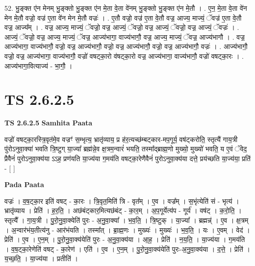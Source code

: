 \documentclass[17pt]{extarticle}
\begin{document}
52. भु॒ङ्क्त ए॑न मेनम् भु॒ङ्क्तो भु॒ङ्क्त ए॑न मे॒ता वे॒ता वे॑नम् भु॒ङ्क्तो भु॒ङ्क्त ए॑न मे॒तौ । . ए॒न॒ मे॒ता वे॒ता वे॑न मेन मे॒तौ वज्रो॒ वज्र॑ ए॒ता वे॑न मेन मे॒तौ वज्रः॑ । . ए॒तौ वज्रो॒ वज्र॑ ए॒ता वे॒तौ वज्र॒ आज्य॒ माज्यं॒ ॅवज्र॑ ए॒ता वे॒तौ वज्र॒ आज्य᳚म् । . वज्र॒ आज्य॒ माज्यं॒ ॅवज्रो॒ वज्र॒ आज्यं॒ ॅवज्रो॒ वज्र॒ आज्यं॒ ॅवज्रो॒ वज्र॒ आज्यं॒ ॅवज्रः॑ । . आज्यं॒ ॅवज्रो॒ वज्र॒ आज्य॒ माज्यं॒ ॅवज्र॒ आज्य॑भागा॒ वाज्य॑भागौ॒ वज्र॒ आज्य॒ माज्यं॒ ॅवज्र॒ आज्य॑भागौ । . वज्र॒ आज्य॑भागा॒ वाज्य॑भागौ॒ वज्रो॒ वज्र॒ आज्य॑भागौ॒ वज्रो॒ वज्र॒ आज्य॑भागौ॒ वज्रो॒ वज्र॒ आज्य॑भागौ॒ वज्रः॑ । . आज्य॑भागौ॒ वज्रो॒ वज्र॒ आज्य॑भागा॒ वाज्य॑भागौ॒ वज्रो॑ वषट्का॒रो व॑षट्का॒रो वज्र॒ आज्य॑भागा॒ वाज्य॑भागौ॒ वज्रो॑ वषट्का॒रः । . आज्य॑भागा॒वित्याज्य॑ - भा॒गौ॒ । \newline
\pagebreak
{}

\section{ TS 2.6.2.5 }

\textbf{TS 2.6.2.5 } \newline
\textbf{Samhita Paata} \newline

वज्रो॑ वषट्का॒रस्त्रि॒वृत॑मे॒व वज्रꣳ॑ स॒म्भृत्य॒ भ्रातृ॑व्याय॒ प्र ह॑र॒त्यच्छ॑म्बट्कार-मप॒गूर्य॒ वष॑ट्करोति॒ स्तृत्यै॑ गाय॒त्री पु॑रोऽनुवा॒क्या॑ भवति त्रि॒ष्टुग् या॒ज्या᳚ ब्रह्म॑न्ने॒व क्ष॒त्रम॒न्वारं॑ भयति॒ तस्मा᳚द्ब्राह्म॒णो मुख्यो॒ मुख्यो॑ भवति॒ य ए॒वं ॅवेद॒ प्रैवैनं॑ पुरोऽनुवा॒क्य॑या ऽऽह॒ प्रण॑यति या॒ज्य॑या ग॒मय॑ति वषट्का॒रेणैवैनं॑ पुरोऽनुवा॒क्य॑या दत्ते॒ प्रय॑च्छति या॒ज्य॑या॒ प्रति॑ - [  ] \newline

\textbf{Pada Paata} \newline

वज्रः॑ । व॒ष॒ट्का॒र इति॑ वषट् - का॒रः । त्रि॒वृत॒मिति॑ त्रि - वृत᳚म् । ए॒व । वज्र᳚म् । स॒भृंत्येति॑ सं - भृत्य॑ । भ्रातृ॑व्याय । प्रेति॑ । ह॒र॒ति॒ । अछ॑बंट्कार॒मित्यछ॑बंट् - का॒र॒म् । अ॒प॒गूर्येत्य॑प - गूर्य॑ । वष॑ट् । क॒रो॒ति॒ । स्तृत्यै᳚ । गा॒य॒त्री । पु॒रो॒नु॒वा॒क्येति॑ पुरः - अ॒नु॒वा॒क्या᳚ । भ॒व॒ति॒ । त्रि॒ष्टुक् । या॒ज्या᳚ । ब्रह्मन्न्॑ । ए॒व । क्ष॒त्रम् । अ॒न्वार॑भंय॒तीत्य॑नु - आर॑भंयति । तस्मा᳚त् । ब्रा॒ह्म॒णः । मुख्यः॑ । मुख्यः॑ । भ॒व॒ति॒ । यः । ए॒वम् । वेद॑ । प्रेति॑ । ए॒व । ए॒न॒म् । पु॒रो॒नु॒वा॒क्य॑येति॑ पुरः - अ॒नु॒वा॒क्य॑या । आ॒ह॒ । प्रेति॑ । न॒य॒ति॒ । या॒ज्य॑या । ग॒मय॑ति । व॒ष॒ट्का॒रेणेति॑ वषट् - का॒रेण॑ । एति॑ । ए॒व । ए॒न॒म् । पु॒रो॒नु॒वा॒क्य॑येति॑ पुरः-अ॒नु॒वा॒क्य॑या । द॒त्ते॒ । प्रेति॑ । य॒च्छ॒ति॒ । या॒ज्य॑या । प्रतीति॑ ।  \newline
\end{document}
